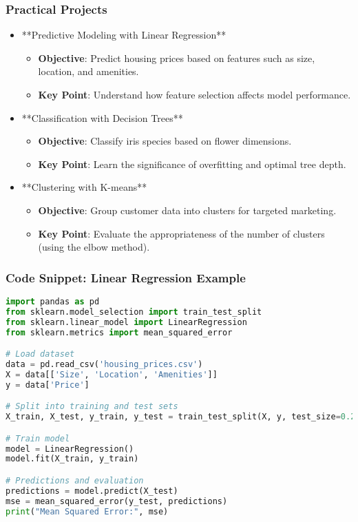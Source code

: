 \documentclass[aspectratio=169]{beamer}
\begin{document}
\begin{frame}
    \frametitle{Practical Projects}
    \begin{itemize}
        \item **Predictive Modeling with Linear Regression**
        \begin{itemize}
            \item \textbf{Objective}: Predict housing prices based on features such as size, location, and amenities.
            \item \textbf{Key Point}: Understand how feature selection affects model performance.
        \end{itemize}

        \item **Classification with Decision Trees**
        \begin{itemize}
            \item \textbf{Objective}: Classify iris species based on flower dimensions.
            \item \textbf{Key Point}: Learn the significance of overfitting and optimal tree depth.
        \end{itemize}

        \item **Clustering with K-means**
        \begin{itemize}
            \item \textbf{Objective}: Group customer data into clusters for targeted marketing.
            \item \textbf{Key Point}: Evaluate the appropriateness of the number of clusters (using the elbow method).
        \end{itemize}
    \end{itemize}
\end{frame}

\begin{frame}[fragile]
    \frametitle{Code Snippet: Linear Regression Example}
    \begin{lstlisting}[language=Python]
import pandas as pd
from sklearn.model_selection import train_test_split
from sklearn.linear_model import LinearRegression
from sklearn.metrics import mean_squared_error

# Load dataset
data = pd.read_csv('housing_prices.csv')
X = data[['Size', 'Location', 'Amenities']]
y = data['Price']

# Split into training and test sets
X_train, X_test, y_train, y_test = train_test_split(X, y, test_size=0.2, random_state=42)

# Train model
model = LinearRegression()
model.fit(X_train, y_train)

# Predictions and evaluation
predictions = model.predict(X_test)
mse = mean_squared_error(y_test, predictions)
print("Mean Squared Error:", mse)
    \end{lstlisting}
\end{frame}
\end{document}
